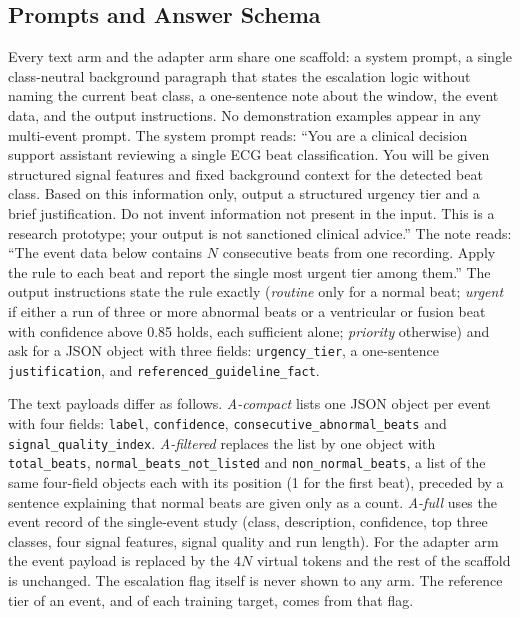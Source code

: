 \subsection{Prompts and Answer Schema}
Every text arm and the adapter arm share one scaffold: a system prompt, a single class-neutral background paragraph that states the escalation logic without naming the current beat class, a one-sentence note about the window, the event data, and the output instructions. No demonstration examples appear in any multi-event prompt. The system prompt reads: ``You are a clinical decision support assistant reviewing a single ECG beat classification. You will be given structured signal features and fixed background context for the detected beat class. Based on this information only, output a structured urgency tier and a brief justification. Do not invent information not present in the input. This is a research prototype; your output is not sanctioned clinical advice.'' The note reads: ``The event data below contains $N$ consecutive beats from one recording. Apply the rule to each beat and report the single most urgent tier among them.'' The output instructions state the rule exactly (\emph{routine} only for a normal beat; \emph{urgent} if either a run of three or more abnormal beats or a ventricular or fusion beat with confidence above 0.85 holds, each sufficient alone; \emph{priority} otherwise) and ask for a JSON object with three fields: \texttt{urgency\_tier}, a one-sentence \texttt{justification}, and \texttt{referenced\_guideline\_fact}.

The text payloads differ as follows. \emph{A-compact} lists one JSON object per event with four fields: \texttt{label}, \texttt{confidence}, \texttt{consecutive\_abnormal\_beats} and \texttt{signal\_quality\_index}. \emph{A-filtered} replaces the list by one object with \texttt{total\_beats}, \texttt{normal\_beats\_not\_listed} and \texttt{non\_normal\_beats}, a list of the same four-field objects each with its position (1 for the first beat), preceded by a sentence explaining that normal beats are given only as a count. \emph{A-full} uses the event record of the single-event study (class, description, confidence, top three classes, four signal features, signal quality and run length). For the adapter arm the event payload is replaced by the $4N$ virtual tokens and the rest of the scaffold is unchanged. The escalation flag itself is never shown to any arm. The reference tier of an event, and of each training target, comes from that flag.

